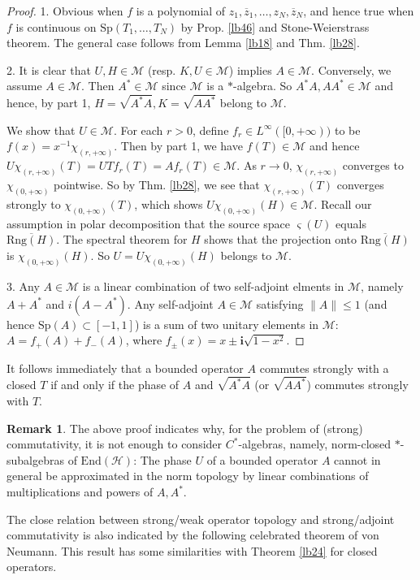 \documentclass[12pt,b5paper,notitlepage]{article}
\theoremstyle{definition}
\newtheorem{rem}[df]{Remark}
\theoremstyle{plain}
\newcommand{\mc}{\mathcal}
\newcommand{\ovl}{\overline}
\newcommand{\End}{\mathrm{End}} %
\newcommand{\im}{\mathbf{i}}
\newcommand{\sgm}{\varsigma}
\newcommand{\Sp}{\mathrm{Sp}}
\newcommand{\Rng}{\mathrm{Rng}}
\numberwithin{equation}{section}
\begin{document}
\begin{proof}
1. Obvious when $f$ is a polynomial of $z_1,\ovl z_1,\dots,z_N,\ovl z_N$, and hence true when $f$ is continuous on  $\Sp(T_1,\dots,T_N)$ by Prop. \ref{lb46} and Stone-Weierstrass theorem. The general case follows from Lemma \ref{lb18} and Thm. \ref{lb28}.

2. It is clear that $U,H\in\mc M$ (resp. $K,U\in\mc M$)  implies $A\in\mc M$. Conversely, we assume $A\in\mc M$. Then $A^*\in\mc M$ since $\mc M$ is a $*$-algebra. So $A^*A,AA^*\in\mc M$ and hence, by part 1, $H=\sqrt{A^*A},K=\sqrt{AA^*}$ belong to $\mc M$.

We show that $U\in \mc M$. For each $r>0$, define $f_r\in L^\infty([0,+\infty))$ to be $f(x)=x^{-1}\chi_{(r,+\infty)}$. Then by part 1, we have $f(T)\in\mc M$ and hence $U\chi_{(r,+\infty)}(T)=UTf_r(T)=Af_r(T)\in\mc M$. As $r\rightarrow 0$, $\chi_{(r,+\infty)}$ converges to $\chi_{(0,+\infty)}$ pointwise. So by Thm. \ref{lb28}, we see that $\chi_{(r,+\infty)}(T)$ converges strongly to $\chi_{(0,+\infty)}(T)$, which shows $U\chi_{(0,+\infty)}(H)\in\mc M$. Recall our assumption in polar decomposition that the source space $\sgm(U)$ equals $\ovl{\Rng(H)}$. The spectral theorem for $H$ shows that the projection onto $\ovl{\Rng(H)}$ is $\chi_{(0,+\infty)}(H)$. So $U=U\chi_{(0,+\infty)}(H)$ belongs to $\mc M$.

3. Any $A\in\mc M$ is a linear combination of two self-adjoint elments in $\mc M$, namely $A+A^*$ and $i(A-A^*)$. Any self-adjoint $A\in\mc M$ satisfying $\lVert A\lVert \leq1$ (and hence $\Sp(A)\subset[-1,1]$) is a sum of two unitary elements in $\mc M$: $A=f_+(A)+f_-(A)$, where $f_\pm(x)=x\pm\im\sqrt{1-x^2}$.
\end{proof}


It follows immediately that a bounded operator $A$ commutes strongly with a closed $T$ if and only if the phase of $A$ and $\sqrt{A^*A}$ (or $\sqrt{AA^*}$) commutes strongly with $T$.


\begin{rem}
The above proof indicates why, for the problem of (strong) commutativity, it is not enough to consider $C^*$-algebras, namely, norm-closed $*$-subalgebras of $\End(\mc H)$: The phase $U$ of a bounded operator $A$ cannot in general be approximated in the norm topology by linear combinations of multiplications and powers of $A,A^*$.
\end{rem}


The close relation between strong/weak operator topology and strong/adjoint commutativity is also indicated by the following celebrated theorem of von Neumann. This result has some similarities with Theorem \ref{lb24} for closed operators.
\end{document}
